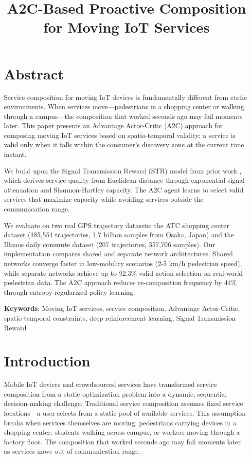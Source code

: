 \documentclass[10pt,twocolumn]{article}
\author{}
\date{}
\begin{document}
\title{A2C-Based Proactive Composition for Moving IoT Services}

\maketitle

\section*{Abstract}\label{abstract}

Service composition for moving IoT devices is fundamentally different
from static environments. When services move---pedestrians in a shopping
center or walking through a campus---the composition that worked seconds
ago may fail moments later. This paper presents an Advantage
Actor-Critic (A2C) approach for composing moving IoT services based on
spatio-temporal validity: a service is valid only when it falls within
the consumer's discovery zone at the current time instant.

We build upon the Signal Transmission Reward (STR) model from prior work \cite{neiat2021}, which derives service quality from Euclidean distance through exponential signal attenuation and Shannon-Hartley capacity. The A2C
agent learns to select valid services that maximize capacity while
avoiding services outside the communication range.

We evaluate on two real GPS trajectory datasets: the ATC shopping center
dataset (185,554 trajectories, 1.7 billion samples from Osaka, Japan)
and the Illinois daily commute dataset (207 trajectories, 357,706
samples). Our implementation compares shared and separate network
architectures. Shared networks converge faster in low-mobility
scenarios (2-5 km/h pedestrian speed), while separate networks achieve
up to 92.3\% valid action selection on real-world pedestrian data.
The A2C approach reduces re-composition frequency by 44\% through
entropy-regularized policy learning.

\textbf{Keywords}: Moving IoT services, service composition, Advantage
Actor-Critic, spatio-temporal constraints, deep reinforcement learning,
Signal Transmission Reward

\section{Introduction}\label{introduction}

Mobile IoT devices and crowdsourced services have transformed service
composition from a static optimization problem into a dynamic,
sequential decision-making challenge. Traditional service composition
assumes fixed service locations---a user selects from a static pool of
available services. This assumption breaks when services themselves are
moving: pedestrians carrying devices in a shopping center, students
walking across campus, or workers moving through a factory floor. The composition that
worked seconds ago may fail moments later as services move out of
communication range.
\end{document}
